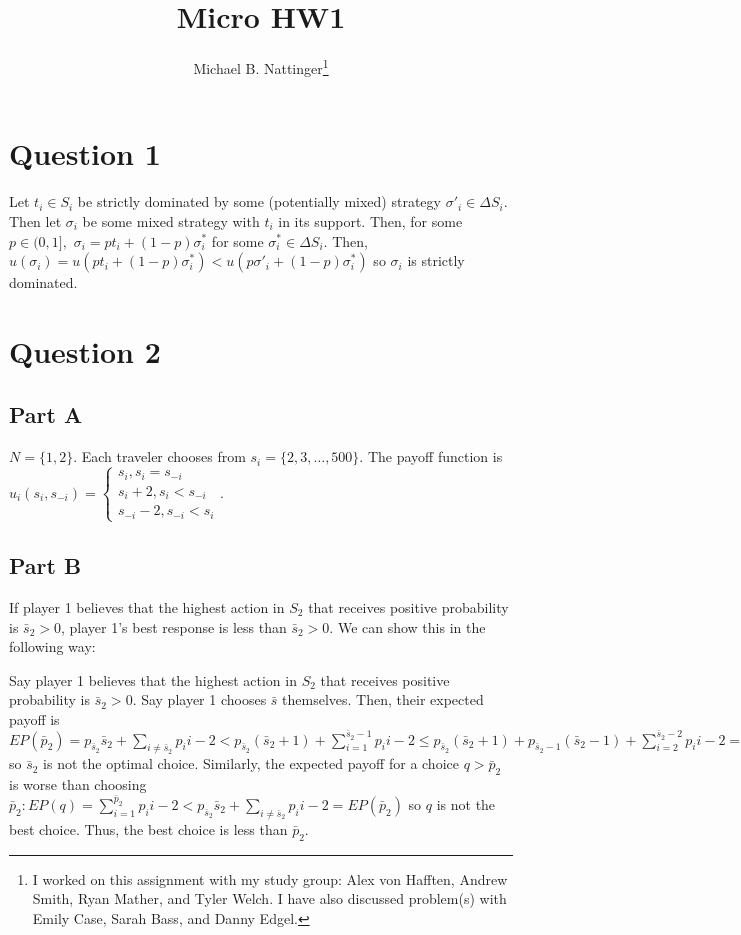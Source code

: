 \documentclass[11pt]{article} %
\title{Micro HW1}
\author{Michael B. Nattinger\footnote{I worked on this assignment with my study group: Alex von Hafften, Andrew Smith, Ryan Mather, and Tyler Welch. I have also discussed problem(s) with Emily Case, Sarah Bass, and Danny Edgel.}}
\begin{document}
\maketitle

\section{Question 1}
Let $t_i \in S_i$ be strictly dominated by some (potentially mixed) strategy $\sigma'_i \in \Delta S_i$. Then let $\sigma_i$ be some mixed strategy with $t_i$ in its support. Then, for some $p \in (0,1],$ $\sigma_i = p t_i + (1-p) \sigma^{*}_i$ for some $\sigma^{*}_i \in \Delta S_i.$ Then, $u(\sigma_i) = u( p t_i + (1-p) \sigma^{*}_i) < u( p \sigma'_i + (1-p) \sigma^{*}_i)$ so $\sigma_i$ is strictly dominated.
\section{Question 2}
\subsection{Part A}
$N = \{ 1,2\}$. Each traveler chooses from $s_i = \{ 2,3,\dots ,500 \}$. The payoff function is $u_i(s_i,s_{-i}) = \begin{cases} s_i, s_i = s_{-i} \\ s_i+2, s_i<s_{-i}  \\ s_{-i}-2, s_{-i}<s_i \end{cases}$.
\subsection{Part B}
If player 1 believes that the highest action in $S_2$ that receives positive probability is $\bar{s}_2>0$, player 1's best response is less than  $\bar{s}_2>0$. We can show this in the following way:

Say player 1 believes that the highest action in $S_2$ that receives positive probability is $\bar{s}_2>0$. Say player 1 chooses $\bar{s}$ themselves. Then, their expected payoff is $EP(\bar{p}_2) = p_{\bar{s}_2} \bar{s}_2 + \sum_{i\neq \bar{s}_2} p_i i-2 <p_{\bar{s}_2} (\bar{s}_2+1) + \sum_{i=1}^{\bar{s}_2 -1} p_i i-2 \leq p_{\bar{s}_2} (\bar{s}_2 +1) +  p_{\bar{s}_2 -1} (\bar{s}_2 -1) +  \sum_{i=2 }^{\bar{s}_2-2} p_i i-2  =  EP(\bar{p}_2-1) $ so $\bar{s}_2$ is not the optimal choice. Similarly, the expected payoff for a choice $q>\bar{p}_2$ is worse than choosing $\bar{p}_2: EP(q) = \sum_{i=1}^{\bar{p}_2} p_i i-2 <  p_{\bar{s}_2} \bar{s}_2 + \sum_{i\neq \bar{s}_2} p_i i-2 = EP(\bar{p}_2)$ so $q$ is not the best choice. Thus, the best choice is less than $\bar{p}_2$.
\end{document}

